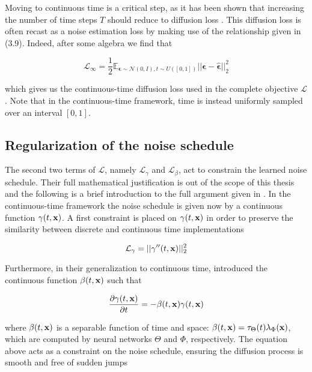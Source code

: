 Moving to continuous time is a critical step, as it has been shown that increasing the number of time steps $T$ should reduce to diffusion loss \parencite{Kingma2023}. This diffusion loss is often recast as a noise estimation loss by making use of the relationship given in (3.9). Indeed, after some algebra we find that

\begin{equation*}
\mathcal{L}_\infty = \frac{1}{2} \mathbb{E}_{\boldsymbol{\epsilon} \sim \mathcal{N}(0,I),t \sim U([0,1])} \lvert\lvert \boldsymbol{\epsilon} - \hat{\boldsymbol{\epsilon}} \lvert\lvert_{2}^{2}
\end{equation*}

which gives us the continuous-time diffusion loss used in the complete objective $\mathcal{L}$. Note that in the continuous-time framework, time is instead uniformly sampled over an interval $[0,1]$. 

\subsection{Regularization of the noise schedule}

The second two terms of $\mathcal{L}$, namely $\mathcal{L}_{\gamma}$ and $\mathcal{L}_{\beta}$, act to constrain the learned noise schedule. Their full mathematical justification is out of the scope of this thesis and the following is a brief introduction to the full argument given in \parencite{Maggiora2023}. In the continuous-time framework the noise schedule is given now by a continuous function $\gamma(t,\bold{x})$. A first constraint is placed on $\gamma(t,\bold{x})$ in order to preserve the similarity between discrete and continuous time implementations 

\begin{equation*}
\mathcal{L}_{\gamma} = \lvert\lvert \gamma''(t,\bold{x}) \lvert\lvert_{2}^{2}
\end{equation*}

Furthermore, in their generalization to continuous time, \parencite{Maggiora2023} introduced the continuous function $\beta(t,\bold{x})$ such that

\begin{equation*}
\frac{\partial \gamma(t,\bold{x})}{\partial t} = -\beta(t,\bold{x})\gamma(t,\bold{x})
\end{equation*}

where $\beta(t,\bold{x})$ is a separable function of time and space: $\beta(t,\bold{x}) = \tau_{\Theta}(t)\lambda_{\Phi}(\bold{x})$, which are computed by neural networks $\Theta$ and $\Phi$, respectively. The equation above acts as a constraint on the noise schedule,    ensuring the diffusion process is smooth and free of sudden jumps


